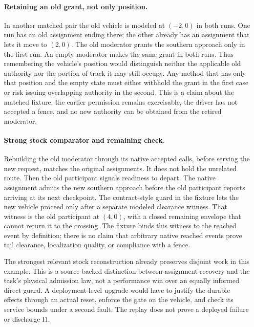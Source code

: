 \documentclass[11pt]{article}
\begin{document}
\paragraph{Retaining an old grant, not only position.}
In another matched pair the old vehicle is modeled at \((-2,0)\)
in both runs. One run has an old assignment ending there; the other
already has an assignment that lets it move to \((2,0)\). The old
moderator grants the southern approach only in the first run.
An empty moderator makes the same grant in both runs. Thus remembering
the vehicle's position would distinguish neither the applicable old
authority nor the portion of track it may still occupy. Any method
that has only that position and the empty state must either withhold
the grant in the first case or risk issuing overlapping authority
in the second. This is a claim about the matched fixture: the earlier
permission remains exercisable, the driver has not accepted a fence,
and no new authority can be obtained from the retired moderator.

\paragraph{Strong stock comparator and remaining check.}
Rebuilding the old moderator through its native accepted calls,
before serving the new request, matches the original assignments.
It does not hold the unrelated route. Then the old participant
signals readiness to depart. The native assignment admits the new
southern approach before the old participant reports arriving at its
next checkpoint. The contract-style guard in the fixture lets the
new vehicle proceed only after a separate modeled clearance witness.
That witness is the old participant at \((4,0)\), with a closed
remaining envelope that cannot return it to the crossing. The
fixture binds this witness to the reached event by definition;
there is no claim that arbitrary native reached events prove tail
clearance, localization quality, or compliance with a fence.

The strongest relevant stock reconstruction already preserves
disjoint work in this example. This is a source-backed distinction
between assignment recovery and the task's physical admission law,
not a performance win over an equally informed direct guard. A
deployment-level upgrade would have to justify the durable effects
through an actual reset, enforce the gate on the vehicle, and check
its service bounds under a second fault. The replay does not prove
a deployed failure or discharge I1.
\end{document}
